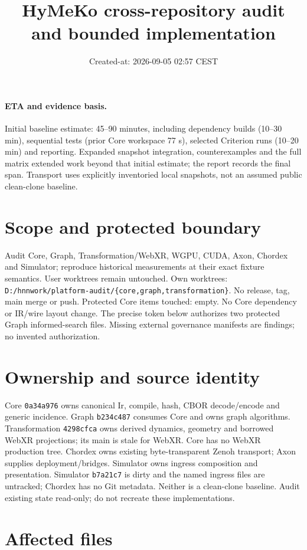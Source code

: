 \documentclass[10pt,a4paper]{article}
\title{HyMeKo cross-repository audit and bounded implementation}
\date{Created-at: 2026-09-05 02:57 CEST}
\begin{document}
\maketitle
\paragraph{ETA and evidence basis.} Initial baseline estimate: 45--90 minutes, including dependency builds (10--30 min), sequential tests (prior Core workspace 77 s), selected Criterion runs (10--20 min) and reporting. Expanded snapshot integration, counterexamples and the full matrix extended work beyond that initial estimate; the report records the final span. Transport uses explicitly inventoried local snapshots, not an assumed public clean-clone baseline.
\section{Scope and protected boundary}
Audit Core, Graph, Transformation/WebXR, WGPU, CUDA, Axon, Chordex and Simulator; reproduce historical measurements at their exact fixture semantics. User worktrees remain untouched. Own worktrees: \texttt{D:/hnnwork/platform-audit/\{core,graph,transformation\}}. No release, tag, main merge or push.
Protected Core items touched: empty. No Core dependency or IR/wire layout change. The precise token below authorizes two protected Graph informed-search files. Missing external governance manifests are findings; no invented authorization.
\section{Ownership and source identity}
Core \texttt{0a34a976} owns canonical Ir, compile, hash, CBOR decode/encode and generic incidence. Graph \texttt{b234c487} consumes Core and owns graph algorithms. Transformation \texttt{4298cfca} owns derived dynamics, geometry and borrowed WebXR projections; its main is stale for WebXR. Core has no WebXR production tree. Chordex owns existing byte-transparent Zenoh transport; Axon supplies deployment/bridges. Simulator owns ingress composition and presentation.
Simulator \texttt{b7a21c7} is dirty and the named ingress files are untracked; Chordex has no Git metadata. Neither is a clean-clone baseline. Audit existing state read-only; do not recreate these implementations.
\section{Affected files}
\end{document}
